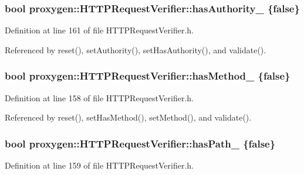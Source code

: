 \subsubsection[{has\+Authority\+\_\+}]{\setlength{\rightskip}{0pt plus 5cm}bool proxygen\+::\+H\+T\+T\+P\+Request\+Verifier\+::has\+Authority\+\_\+ \{false\}\hspace{0.3cm}{\ttfamily [private]}}\label{classproxygen_1_1HTTPRequestVerifier_aa68702559a077ae01ce2833e4cda0b56}


Definition at line 161 of file H\+T\+T\+P\+Request\+Verifier.\+h.



Referenced by reset(), set\+Authority(), set\+Has\+Authority(), and validate().

\subsubsection[{has\+Method\+\_\+}]{\setlength{\rightskip}{0pt plus 5cm}bool proxygen\+::\+H\+T\+T\+P\+Request\+Verifier\+::has\+Method\+\_\+ \{false\}\hspace{0.3cm}{\ttfamily [private]}}\label{classproxygen_1_1HTTPRequestVerifier_a2b2f9f831a7bcb27066e9e80b84d608a}


Definition at line 158 of file H\+T\+T\+P\+Request\+Verifier.\+h.



Referenced by reset(), set\+Has\+Method(), set\+Method(), and validate().

\subsubsection[{has\+Path\+\_\+}]{\setlength{\rightskip}{0pt plus 5cm}bool proxygen\+::\+H\+T\+T\+P\+Request\+Verifier\+::has\+Path\+\_\+ \{false\}\hspace{0.3cm}{\ttfamily [private]}}\label{classproxygen_1_1HTTPRequestVerifier_a197ced6d781b39828924761d75c96dc3}


Definition at line 159 of file H\+T\+T\+P\+Request\+Verifier.\+h.



